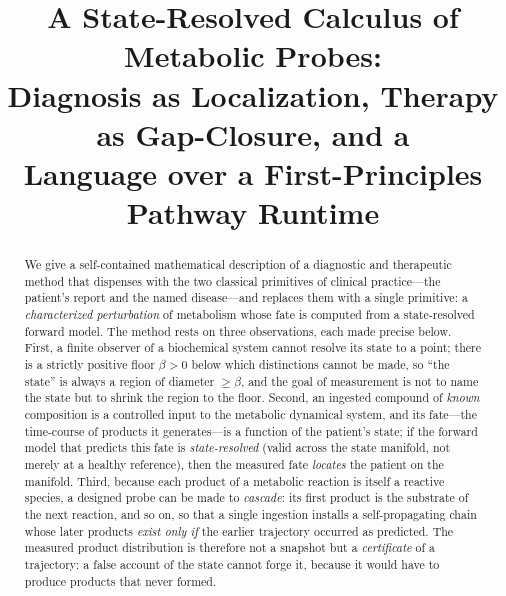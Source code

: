 \documentclass[11pt,a4paper]{article}
\title{\textbf{A State-Resolved Calculus of Metabolic Probes:\\[3pt]
Diagnosis as Localization, Therapy as Gap-Closure, and a\\
Language over a First-Principles Pathway Runtime}}
\author{}
\date{}
\theoremstyle{thmstyle}
\theoremstyle{definition}
\theoremstyle{remark}
\newcommand{\flo}{\beta}                %
\begin{document}
\maketitle

\begin{abstract}
\noindent
We give a self-contained mathematical description of a diagnostic and
therapeutic method that dispenses with the two classical primitives of
clinical practice---the patient's report and the named disease---and
replaces them with a single primitive: a \emph{characterized
perturbation} of metabolism whose fate is computed from a state-resolved
forward model. The method rests on three observations, each made precise
below. First, a finite observer of a biochemical system cannot resolve
its state to a point; there is a strictly positive floor $\flo>0$ below
which distinctions cannot be made, so ``the state'' is always a region of
diameter $\ge\flo$, and the goal of measurement is not to name the state
but to shrink the region to the floor. Second, an ingested compound of
\emph{known} composition is a controlled input to the metabolic
dynamical system, and its fate---the time-course of products it
generates---is a function of the patient's state; if the forward model
that predicts this fate is \emph{state-resolved} (valid across the state
manifold, not merely at a healthy reference), then the measured fate
\emph{locates} the patient on the manifold. Third, because each product
of a metabolic reaction is itself a reactive species, a designed probe
can be made to \emph{cascade}: its first product is the substrate of the
next reaction, and so on, so that a single ingestion installs a
self-propagating chain whose later products \emph{exist only if} the
earlier trajectory occurred as predicted. The measured product
distribution is therefore not a snapshot but a \emph{certificate} of a
trajectory: a false account of the state cannot forge it, because it
would have to produce products that never formed.


\end{abstract}
\end{document}
